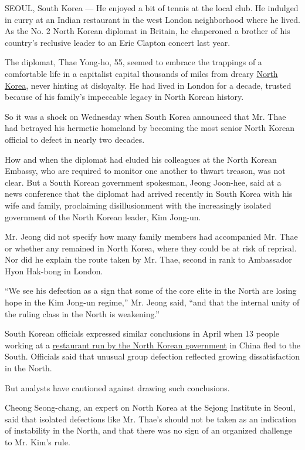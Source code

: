 SEOUL, South Korea --- He enjoyed a bit of tennis at the local club. He
indulged in curry at an Indian restaurant in the west London
neighborhood where he lived. As the No. 2 North Korean diplomat in
Britain, he chaperoned a brother of his country's reclusive leader to an
Eric Clapton concert last year.

The diplomat, Thae Yong-ho, 55, seemed to embrace the trappings of a
comfortable life in a capitalist capital thousands of miles from dreary
\href{http://topics.nytimes3xbfgragh.onion/top/news/international/countriesandterritories/northkorea/index.html?inline=nyt-geo}{North
Korea}, never hinting at disloyalty. He had lived in London for a
decade, trusted because of his family's impeccable legacy in North
Korean history.

So it was a shock on Wednesday when South Korea announced that Mr. Thae
had betrayed his hermetic homeland by becoming the most senior North
Korean official to defect in nearly two decades.

How and when the diplomat had eluded his colleagues at the North Korean
Embassy, who are required to monitor one another to thwart treason, was
not clear. But a South Korean government spokesman, Jeong Joon-hee, said
at a news conference that the diplomat had arrived recently in South
Korea with his wife and family, proclaiming disillusionment with the
increasingly isolated government of the North Korean leader, Kim
Jong-un.

Mr. Jeong did not specify how many family members had accompanied Mr.
Thae or whether any remained in North Korea, where they could be at risk
of reprisal. Nor did he explain the route taken by Mr. Thae, second in
rank to Ambassador Hyon Hak-bong in London.

``We see his defection as a sign that some of the core elite in the
North are losing hope in the Kim Jong-un regime,'' Mr. Jeong said, ``and
that the internal unity of the ruling class in the North is weakening.''

South Korean officials expressed similar conclusions in April when 13
people working at a
\href{http://www.nytimes3xbfgragh.onion/2016/04/09/world/asia/north-korean-defectors-restaurant-south-korea.html}{restaurant
run by the North Korean government} in China fled to the South.
Officials said that unusual group defection reflected growing
dissatisfaction in the North.

But analysts have cautioned against drawing such conclusions.

Cheong Seong-chang, an expert on North Korea at the Sejong Institute in
Seoul, said that isolated defections like Mr. Thae's should not be taken
as an indication of instability in the North, and that there was no sign
of an organized challenge to Mr. Kim's rule.


